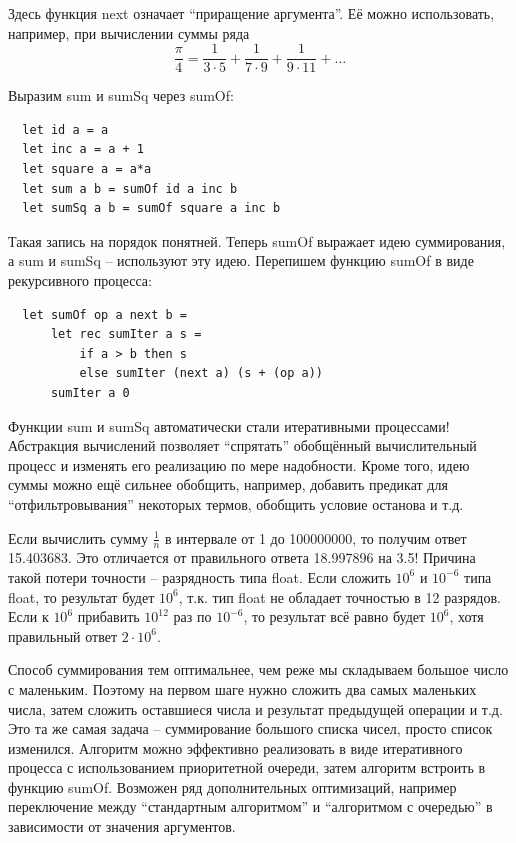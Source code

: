 \documentclass[a4paper,11pt]{article}
\begin{document}
Здесь функция next означает ``приращение аргумента''. Её можно использовать,
например, при вычислении суммы ряда 
\begin{equation*}
  \frac{\pi}{4} = \frac{1}{3 \cdot 5} + \frac{1}{7 \cdot 9} + 
  \frac{1}{9 \cdot 11} + \ldots
\end{equation*}

Выразим sum и sumSq через sumOf:
\begin{lstlisting}
  let id a = a
  let inc a = a + 1
  let square a = a*a
  let sum a b = sumOf id a inc b
  let sumSq a b = sumOf square a inc b
\end{lstlisting}

Такая запись на порядок понятней. Теперь sumOf выражает идею суммирования, а 
sum и sumSq -- используют эту идею. Перепишем функцию sumOf в виде рекурсивного
процесса:
\begin{lstlisting}
  let sumOf op a next b =
      let rec sumIter a s =
          if a > b then s
          else sumIter (next a) (s + (op a))
      sumIter a 0
\end{lstlisting}

Функции sum и sumSq автоматически стали итеративными процессами! Абстракция
вычислений позволяет ``спрятать'' обобщённый вычислительный процесс и изменять
его реализацию по мере надобности. Кроме того, идею суммы можно ещё сильнее
обобщить, например, добавить предикат для ``отфильтровывания'' некоторых термов,
обобщить условие останова и т.д. 

Если вычислить сумму $\frac{1}{n}$ в интервале от 1 до 100000000, то получим
ответ 15.403683. Это отличается от правильного ответа 18.997896 на 3.5! Причина
такой потери точности -- разрядность типа float. Если сложить $10^6$ и $10^{-6}$
типа float, то результат будет $10^6$, т.к. тип float не обладает точностью в
12 разрядов. Если к $10^6$ прибавить $10^{12}$ раз по $10^{-6}$, то результат всё
равно будет $10^6$, хотя правильный ответ $2\cdot10^6$.

Способ суммирования тем оптимальнее, чем реже мы складываем большое число с 
маленьким. Поэтому на первом шаге нужно сложить два самых маленьких числа, затем
сложить оставшиеся числа и результат предыдущей операции и т.д. Это та же самая
задача -- суммирование большого списка чисел, просто список изменился. Алгоритм
можно эффективно реализовать в виде итеративного процесса с использованием
приоритетной очереди, затем алгоритм встроить в функцию sumOf. Возможен ряд
дополнительных оптимизаций, например переключение между ``стандартным
алгоритмом'' и ``алгоритмом с очередью'' в зависимости от значения аргументов.
\end{document}
